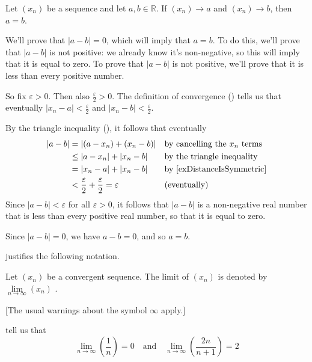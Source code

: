 \begin{theorem}
\label{thmUniquenessofLimits}
Let $(x_n)$ be a sequence and let $a,b \in \mathbb{R}$. If $(x_n) \to a$ and $(x_n) \to b$, then $a=b$.
\end{theorem}

\begin{cproof}
We'll prove that $|a-b|=0$, which will imply that $a=b$. To do this, we'll prove that $|a-b|$ is not positive: we already know it's non-negative, so this will imply that it is equal to zero. To prove that $|a-b|$ is not positive, we'll prove that it is less than every positive number.

So fix $\varepsilon > 0$. Then also $\frac{\varepsilon}{2}>0$. The definition of convergence () tells us that eventually $|x_n-a|<\frac{\varepsilon}{2}$ and $|x_n-b|<\frac{\varepsilon}{2}$.

By the triangle inequality (), it follows that eventually
\begin{align*}
|a-b| &= |(a-x_n) + (x_n-b)| && \text{by cancelling the $x_n$ terms} \\
&\le |a-x_n| + |x_n-b| && \text{by the triangle inequality} \\
&= |x_n-a| + |x_n-b| && \text{by \Cref{exDistanceIsSymmetric}} \\
&< \frac{\varepsilon}{2} + \frac{\varepsilon}{2} = \varepsilon && \text{(eventually)}
\end{align*}
Since $|a-b|<\varepsilon$ for all $\varepsilon > 0$, it follows that $|a-b|$ is a non-negative real number that is less than every positive real number, so that it is equal to zero.

Since $|a-b|=0$, we have $a-b=0$, and so $a=b$.
\end{cproof}

 justifies the following notation.

\begin{definition}
\label{defLimitOfSequenceNotation}
Let $(x_n)$ be a convergent sequence. The limit of $(x_n)$ is denoted by $\lim\limits_{n \to \infty} (x_n)$ .
\end{definition}

[The usual warnings about the symbol $\infty$ apply.]

\begin{example}
 tell us that
\[ \lim_{n \to \infty} \left( \frac{1}{n} \right) = 0 \quad \text{and} \quad \lim_{n \to \infty} \left( \frac{2n}{n+1} \right) = 2 \]
\end{example}

